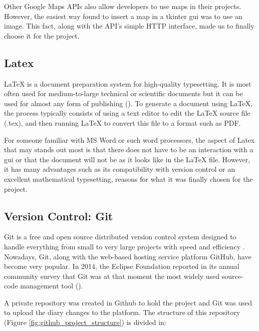 	Other Google Maps APIs also allow developers to use maps in their projects. However, the easiest way found to insert a map in a tkinter \gls{gui} was to use an image. This fact, along with the API's simple HTTP interface, made us to finally choose it for the project.

	\subsection{Latex}
	\LaTeX{} is a document preparation system for high-quality typesetting. It is most often used for medium-to-large technical or scientific documents but it can be used for almost any form of publishing (\cite{latex_main}). To generate a document using LaTeX, the process typically consists of using a text editor to edit the LaTeX source file (.tex), and then running LaTeX to convert this file to a format such as PDF.

	For someone familiar with MS Word or such word processors, the aspect of Latex that may stands out most is that there does not have to be an interaction with a \gls{gui} or that the document will not be as it looks like in the LaTeX file. However, it has many advantages such as its compatibility with version control or an excellent mathematical typesetting, reasons for what it was finally chosen for the project.

	\subsection{Version Control: Git}
	Git is a free and open source distributed version control system designed to handle everything from small to very large projects with speed and efficiency \cite{git_about}. Nowadays, Git, along with the web-based hosting service platform GitHub, have become very popular. In 2014, the Eclipse Foundation reported in its annual community survey that Git was at that moment the most widely used source-code management tool (\cite{git_popular}). 

	A private repository was created in Github to hold the project and Git was used to upload the diary changes to the platform. The structure of this repository (Figure \ref{fig:github_project_structure}) is divided in:

